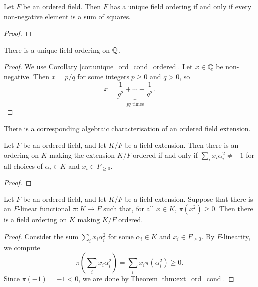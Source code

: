 \begin{corollary}
  \label{cor:unique_ord_cond_ordered}
  \leanok
  Let $F$ be an ordered field. Then $F$ has a unique field ordering if and only if every non-negative element is a sum of squares.
\end{corollary}
\begin{proof}
  \leanok
\end{proof}

\begin{corollary}
  \label{cor:unique_ord_Q}
  \leanok
  There is a unique field ordering on $\mathbb{Q}$.
\end{corollary}
\begin{proof}
  \leanok
  We use Corollary \ref{cor:unique_ord_cond_ordered}. Let $x\in\mathbb{Q}$ be non-negative. Then $x=p/q$ for some integers $p\geq0$ and $q>0$, so 
  \[x=\underbrace{\frac{1}{q^2}+\cdots+\frac{1}{q^2}}_{pq\text{ times}}.\]
\end{proof}

There is a corresponding algebraic characterisation of an ordered field extension.

\begin{theorem}
  \label{thm:ext_ord_cond}
  \leanok
  Let $F$ be an ordered field, and let $K/F$ be a field extension. Then there is an ordering on $K$ making the extension $K/F$ ordered if and only if $\sum_i x_i\alpha_i^2\neq-1$ for all choices of $\alpha_i\in K$ and $x_i\in F_{\geq0}$.
\end{theorem}
\begin{proof}
  \leanok
\end{proof}

\begin{lemma}
  \label{lem:ext_ord_functional_suff}
  \leanok
  Let $F$ be an ordered field, and let $K/F$ be a field extension. Suppose that there is an $F$-linear functional $\pi:K\to F$ such that, for all $x\in K$, $\pi(x^2)\geq0$. Then there is a field ordering on $K$ making $K/F$ ordered.
\end{lemma}
\begin{proof}
  \leanok
  Consider the sum $\sum_i x_i\alpha_i^2$ for some $\alpha_i\in K$ and $x_i\in F_{\geq0}$. By $F$-linearity, we compute
  \[\pi\left(\sum_i x_i\alpha_i^2\right)=\sum_i x_i\pi(\alpha_i^2)\geq0.\]
  Since $\pi(-1)=-1<0$, we are done by Theorem \ref{thm:ext_ord_cond}.
\end{proof}

